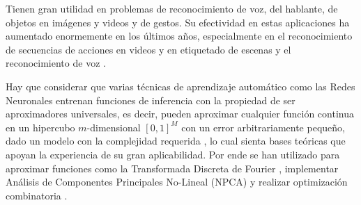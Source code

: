 Tienen gran utilidad en problemas de reconocimiento de voz, del hablante, de objetos en imágenes y videos y de gestos. Su efectividad en estas aplicaciones ha aumentado enormemente en los últimos años, especialmente en el reconocimiento de secuencias de acciones en videos y en etiquetado de escenas \cite{le2011,le2012,farabet2013} y el reconocimiento de voz \cite{hinton2012,deng2013}.

Hay que considerar que varias técnicas de aprendizaje automático como las Redes Neuronales entrenan funciones de inferencia con la propiedad de ser aproximadores universales, es decir, pueden aproximar cualquier función continua en un hipercubo $m$-dimensional $ [0,1]^M $ con un error arbitrariamente pequeño, dado un modelo con la complejidad requerida \cite{haykin1994}, lo cual sienta bases teóricas que apoyan la experiencia de su gran aplicabilidad. Por ende se han utilizado para aproximar funciones como la Transformada Discreta de Fourier \cite{velik2008}, implementar Análisis de Componentes Principales No-Lineal (NPCA) \cite{kramer1991} y realizar optimización combinatoria \cite{smith1999}.